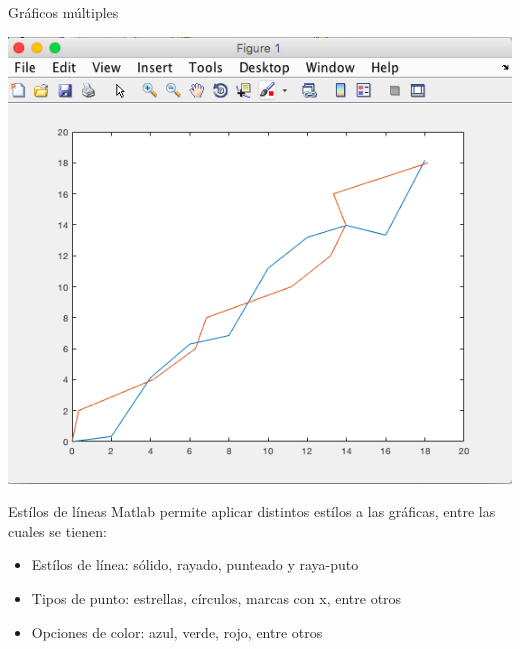 \documentclass{bredelebeamer}
\begin{document}
\begin{frame}{Gráficos múltiples}
\begin{center}
\includegraphics[scale=0.35]{images/pantalla16.png}
\end{center}
\end{frame}

\begin{frame}{Estílos de líneas}
Matlab permite aplicar distintos estílos a las gráficas, entre las cuales se tienen:
\begin{itemize}
\item Estílos de línea: sólido, rayado, punteado y raya-puto
\item Tipos de punto: estrellas, círculos, marcas con x, entre otros
\item Opciones de color: azul, verde, rojo, entre otros
\end{itemize}
\end{frame}
\end{document}
